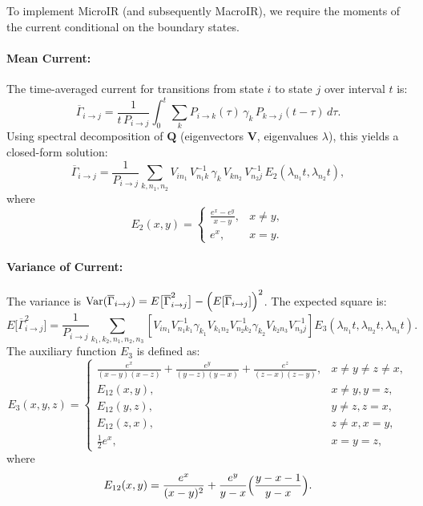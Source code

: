 \documentclass[9pt]{elife}
\begin{document}
To implement MicroIR (and subsequently MacroIR), we require the moments of the current conditional on the boundary states.

\paragraph{Mean Current:}
The time-averaged current for transitions from state \(i\) to state \(j\) over interval \(t\) is:
\begin{equation}
	\overline{\Gamma}_{i \rightarrow j} = \frac{1}{t\,P_{i\rightarrow j}} \int_0^t \sum_k P_{i\rightarrow k}(\tau)\,\gamma_k\,P_{k\rightarrow j}(t-\tau)\,d\tau.
	\label{eq:gamma_ij_integral}
\end{equation}
Using spectral decomposition of \(\mathbf{Q}\) (eigenvectors $\mathbf{V}$, eigenvalues $\lambda$), this yields a closed-form solution:
\begin{equation}
	\overline{\Gamma}_{i \rightarrow j} = \frac{1}{P_{i\rightarrow j}} \sum_{k, n_1, n_2} V_{i n_1}\,V^{-1}_{n_1 k}\,\gamma_k\,V_{k n_2}\,V^{-1}_{n_2 j}\,E_2(\lambda_{n_1}t,\lambda_{n_2}t),
	\label{eq:gamma_ij_formula}
\end{equation}
where
\begin{equation}
	E_2(x,y)= \begin{cases} \frac{e^x-e^y}{x-y}, & x\neq y, \\ e^x, & x=y. \end{cases}
\end{equation}

\paragraph{Variance of Current:}
The variance is $\mathrm{Var}(\overline{\Gamma}_{i\rightarrow j}) = E\bigl[\overline{\Gamma}_{i\rightarrow j}^2\bigr] - \Bigl(E[\overline{\Gamma}_{i\rightarrow j}]\Bigr)^2$. The expected square is:
\begin{equation}
	E\bigl[\overline{\Gamma}_{i\rightarrow j}^2\bigr] = \frac{1}{P_{i\rightarrow j}} \sum_{k_1,k_2,n_1,n_2,n_3} \left[ V_{i n_1}V^{-1}_{n_1 k_1}\gamma_{k_1}V_{k_1 n_2}V^{-1}_{n_2 k_2}\gamma_{k_2}V_{k_2 n_3}V^{-1}_{n_3 j} \right] E_3(\lambda_{n_1}t,\lambda_{n_2}t,\lambda_{n_3}t).
	\label{eq:expected_square_closed}
\end{equation}
The auxiliary function \(E_3\) is defined as:
\begin{equation}
	E_3(x,y,z)= 
	\begin{cases}
		\frac{e^x}{(x-y)(x-z)} + \frac{e^y}{(y-z)(y-x)} + \frac{e^z}{(z-x)(z-y)}, & x\neq y \neq z \neq x,\\[1mm]
		E_{12}(x,y),   & x\neq y, y=z,\\[1mm]
		E_{12}(y,z),   & y\neq z, z=x,\\[1mm]
		E_{12}(z,x),   & z\neq x, x=y,\\[1mm]
		\frac{1}{2}e^x, & x=y=z,
	\end{cases}
	\label{eq:E3}
\end{equation}
where
\begin{equation}
	E_{12}(x,y)= \frac{e^x}{(x-y)^2} + \frac{e^y}{y-x}\Bigl(\frac{y-x-1}{y-x}\Bigr).
\end{equation}
\end{document}
